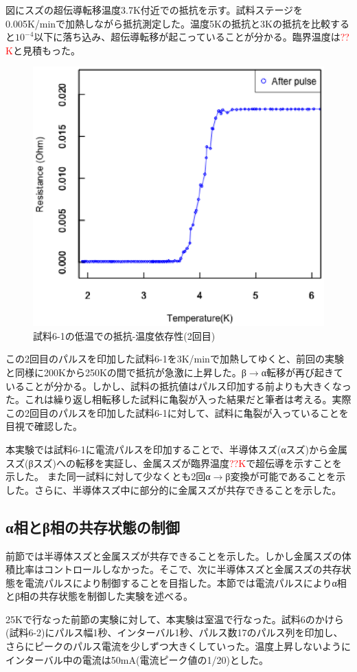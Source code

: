 図にスズの超伝導転移温度3.7K付近での抵抗を示す。試料ステージを0.005K/minで加熱しながら抵抗測定した。温度5Kの抵抗と3Kの抵抗を比較すると$10^{-4}$以下に落ち込み、超伝導転移が起こっていることが分かる。臨界温度は\textcolor{red}{??K}と見積もった。
\begin{figure}[!h]
\begin{center}
   \includegraphics[width=0.5\hsize]{results_discussions/181228_after_pulse.eps}
  \end{center}
  \caption{試料6-1の低温での抵抗-温度依存性(2回目)}
  \label{fig:181228_after_pulse}
\end{figure}

この2回目のパルスを印加した試料6-1を3K/minで加熱してゆくと、前回の実験と同様に200Kから250Kの間で抵抗が急激に上昇した。β$\to$α転移が再び起きていることが分かる。しかし、試料の抵抗値はパルス印加する前よりも大きくなった。これは繰り返し相転移した試料に亀裂が入った結果だと筆者は考える。実際この2回目のパルスを印加した試料6-1に対して、試料に亀裂が入っていることを目視で確認した。

本実験では試料6-1に電流パルスを印加することで、半導体スズ(αスズ)から金属スズ(βスズ)への転移を実証し、金属スズが臨界温度\textcolor{red}{??K}で超伝導を示すことを示した。
また同一試料に対して少なくとも2回α$\to$β変換が可能であることを示した。さらに、半導体スズ中に部分的に金属スズが共存できることを示した。

\subsection{α相とβ相の共存状態の制御}
前節では半導体スズと金属スズが共存できることを示した。しかし金属スズの体積比率はコントロールしなかった。そこで、次に半導体スズと金属スズの共存状態を電流パルスにより制御することを目指した。本節では電流パルスによりα相とβ相の共存状態を制御した実験を述べる。

25Kで行なった前節の実験に対して、本実験は室温で行なった。試料6のかけら(試料6-2)にパルス幅1秒、インターバル1秒、パルス数17のパルス列を印加し、さらにピークのパルス電流を少しずつ大きくしていった。温度上昇しないようにインターバル中の電流は50mA(電流ピーク値の1/20)とした。

